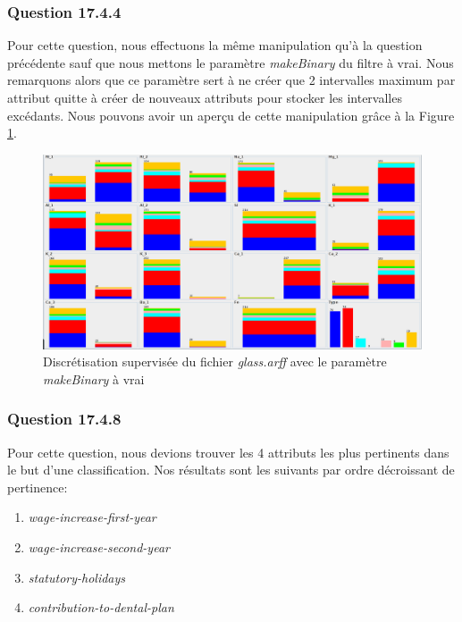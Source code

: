 \documentclass[10pt,a4paper]{article}
\begin{document}
			
			\subsubsection*{Question 17.4.4}
			
			Pour cette question, nous effectuons la même manipulation qu'à la question précédente sauf que nous mettons le paramètre \textit{makeBinary} du filtre à vrai. Nous remarquons alors que ce paramètre sert à ne créer que 2 intervalles maximum par attribut quitte à créer de nouveaux attributs pour stocker les intervalles excédants. Nous pouvons avoir un aperçu de cette manipulation grâce à la Figure \ref{fig:glass:disc:bin}.
			
			\begin{figure}[h]
				\centering
				\includegraphics[width=.8\textwidth]{glass_disc_bin}
				\caption{Discrétisation supervisée du fichier \textit{glass.arff} avec le paramètre \textit{makeBinary} à vrai}
				\label{fig:glass:disc:bin}
			\end{figure}
			
			\subsubsection*{Question 17.4.8}
			
			Pour cette question, nous devions trouver les 4 attributs les plus pertinents dans le but d'une classification. Nos résultats sont les suivants par ordre décroissant de pertinence:
			
			\begin{enumerate}
				\item \textit{wage-increase-first-year}
				\item \textit{wage-increase-second-year}
				\item \textit{statutory-holidays}
				\item \textit{contribution-to-dental-plan}
			\end{enumerate}
			
\end{document}
